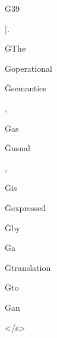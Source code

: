 \documentclass[varwidth]{standalone}
\begin{document}
\begin{CJK*}{UTF8}{gbsn}
{{{\colorbox{red!0.27373666}{\strut Ġ39} \colorbox{red!0.116765335}{\strut ].} \colorbox{red!0.29172486}{\strut ĠThe} \colorbox{red!1.1928374}{\strut Ġoperational} \colorbox{red!0.60362995}{\strut Ġsemantics} \colorbox{red!0.11238466}{\strut ,} \colorbox{red!0.4119119}{\strut Ġas} \colorbox{red!0.46731457}{\strut Ġusual} \colorbox{red!0.5280034}{\strut ,} \colorbox{red!0.39342284}{\strut Ġis} \colorbox{red!0.16049568}{\strut Ġexpressed} \colorbox{red!0.2885457}{\strut Ġby} \colorbox{red!0.30627203}{\strut Ġa} \colorbox{red!0.5742161}{\strut Ġtranslation} \colorbox{red!0.58473754}{\strut Ġto} \colorbox{red!0.4910599}{\strut Ġan} \colorbox{red!0.40423182}{\strut </s>} 
}}}
\end{CJK*}
\end{document}
